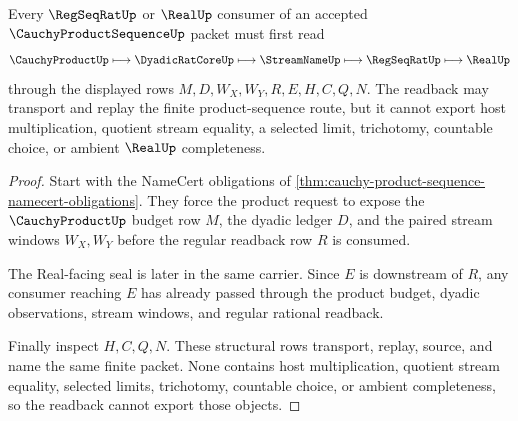\begin{theorem}
\label{thm:cauchy-product-sequence-regular-readback}
Every $\RegSeqRatUp$ or $\RealUp$ consumer of an accepted $\CauchyProductSequenceUp$ packet must first read
$$
\CauchyProductUp \longmapsto \DyadicRatCoreUp \longmapsto \StreamNameUp \longmapsto \RegSeqRatUp \longmapsto \RealUp
$$
through the displayed rows $M,D,W_X,W_Y,R,E,H,C,Q,N$. The readback may transport and replay the finite product-sequence route, but it cannot export host multiplication, quotient stream equality, a selected limit, trichotomy, countable choice, or ambient $\RealUp$ completeness.
\end{theorem}
\begin{proof}
Start with the NameCert obligations of \autoref{thm:cauchy-product-sequence-namecert-obligations}. They force the product request to expose the $\CauchyProductUp$ budget row $M$, the dyadic ledger $D$, and the paired stream windows $W_X,W_Y$ before the regular readback row $R$ is consumed.

The Real-facing seal is later in the same carrier. Since $E$ is downstream of $R$, any consumer reaching $E$ has already passed through the product budget, dyadic observations, stream windows, and regular rational readback.

Finally inspect $H,C,Q,N$. These structural rows transport, replay, source, and name the same finite packet. None contains host multiplication, quotient stream equality, selected limits, trichotomy, countable choice, or ambient completeness, so the readback cannot export those objects.
\end{proof}


\begin{closurestatus}{\CauchyProductSequenceUp}
  \theoryclosure{\seedClosure}
  \formalstatus{\unformalizedV}
\end{closurestatus}
